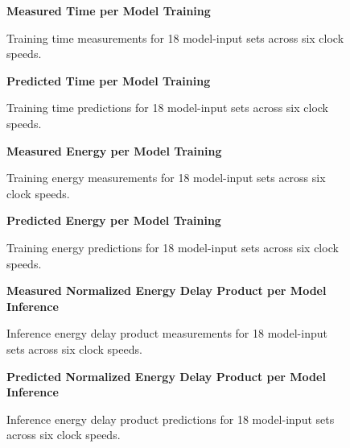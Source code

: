 \begin{figure}[htbp]
    \centering
    \parbox{1.1\textwidth}{\centering\textbf{Measured Time per Model Training}}
    \caption{Training time measurements for 18 model-input sets across six clock speeds.}
    \label{fig:grpfmtimetrain}
    \vspace{0.2cm}
    \parbox{1.1\textwidth}{\centering\textbf{Predicted Time per Model Training}}
    \caption{Training time predictions for 18 model-input sets across six clock speeds.}
    \label{fig:grppredtimetrain}
\end{figure}


\begin{figure}[htbp]
    \centering
    \parbox{1.1\textwidth}{\centering\textbf{Measured Energy per Model Training}}
    \caption{Training energy measurements for 18 model-input sets across six clock speeds.}
    \label{fig:grpfmenergytrain}
    \vspace{0.2cm}
    \parbox{1.1\textwidth}{\centering\textbf{Predicted Energy per Model Training}}
    \caption{Training energy predictions for 18 model-input sets across six clock speeds.}
    \label{fig:grppredenergytrain}
\end{figure}



\begin{figure}[htbp]
    \centering
    \parbox{1.1\textwidth}{\centering\textbf{Measured Normalized Energy Delay Product per Model Inference}}
    \caption{Inference energy delay product measurements for 18 model-input sets across six clock speeds.}
    \label{fig:grppdpfminf}
    \vspace{0.2cm}
    \parbox{1.1\textwidth}{\centering\textbf{Predicted Normalized Energy Delay Product per Model Inference}}
    \caption{Inference energy delay product predictions for 18 model-input sets across six clock speeds.}
    \label{fig:grppdppredinf}
\end{figure}



